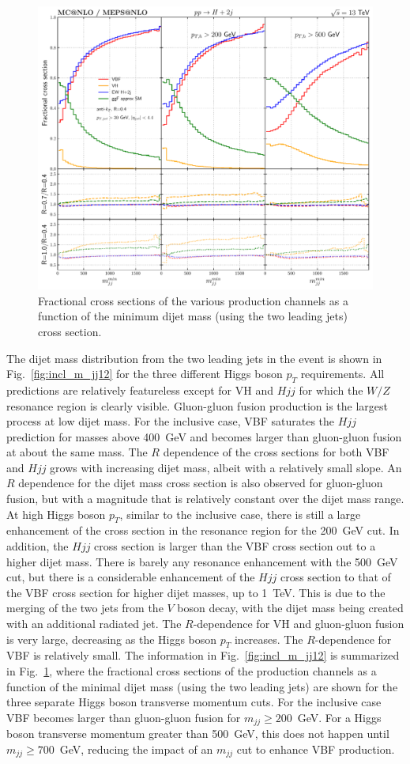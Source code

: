 \documentclass[10pt,prd,fleqn,superscriptaddress,notitlepage,nofootinbib,preprintnumbers,nobalancelastpage]{revtex4-1}
\newcommand{\VBF}{VBF\xspace}
\newcommand{\VH}{VH\xspace}
\begin{document}
\begin{figure}[p]
  \centering
  \includegraphics[width=.675\textwidth]{figures/vbf/m_jj12.pdf}
  \caption{Fractional cross sections of the various production channels
    as a function of the minimum dijet mass (using the two leading jets) cross section.}
\label{fig:incl_m_jj12_fraction}
\end{figure}
The dijet mass distribution from the two leading jets in the event is shown in Fig.~\ref{fig:incl_m_jj12} for the three different Higgs boson $p_T$ requirements.
All predictions are relatively featureless except for \VH and $Hjj$ for which the $W/Z$ resonance region is clearly visible. Gluon-gluon fusion production is the largest process at low dijet mass.  For the inclusive case, \VBF saturates the $Hjj$ prediction for masses above 400~GeV and becomes larger than gluon-gluon fusion at about the same mass. The $R$ dependence of the cross sections for  both \VBF and $Hjj$
grows with increasing dijet mass, albeit with a relatively small slope. An $R$ dependence for the dijet mass cross section is also observed for gluon-gluon fusion, but with a magnitude that is relatively constant over the dijet mass range. At high Higgs boson $p_T$,  similar to the inclusive case, there is still a large enhancement of the cross section in the resonance region for the 200~GeV cut. In addition,  the $Hjj$ cross section is larger than the \VBF cross section out to a higher dijet mass. There is barely any resonance enhancement with the 500~GeV cut, but there is a considerable enhancement of the $Hjj$ cross section to that of the \VBF cross section for higher  dijet masses, up to  1~TeV. This is due to the merging of the two jets from the $V$ boson decay, with the dijet mass being created with an additional radiated jet. The $R$-dependence for \VH and gluon-gluon fusion is very large, decreasing as the Higgs boson $p_T$ increases. The $R$-dependence for \VBF is relatively small. The information in Fig.~\ref{fig:incl_m_jj12} is summarized in Fig.~\ref{fig:incl_m_jj12_fraction}, where the fractional cross sections of the production channels as a function of the minimal dijet mass (using the two leading jets) are shown for the three separate Higgs boson transverse momentum cuts.
For the inclusive case \VBF becomes larger than gluon-gluon fusion for $m_{jj} \ge 200$~GeV. For a Higgs boson transverse momentum greater than 500~GeV, this does not happen until $m_{jj} \ge 700$~GeV, reducing the impact of an $m_{jj}$ cut to enhance \VBF production.
\end{document}
